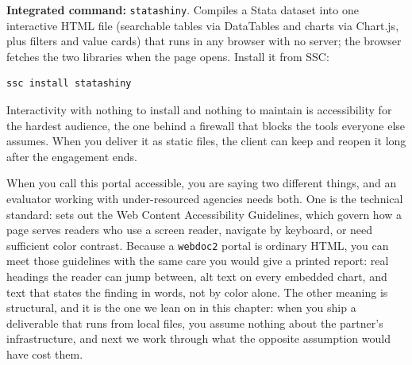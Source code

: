 \begin{kaobox}[frametitle=Package Integration: \texttt{statashiny}]
\textbf{Integrated command:} \texttt{statashiny}. Compiles a Stata dataset into one interactive HTML file (searchable tables via DataTables and charts via Chart.js, plus filters and value cards) that runs in any browser with no server; the browser fetches the two libraries when the page opens. Install it from SSC:
\par
{\footnotesize
\begin{verbatim}
ssc install statashiny
\end{verbatim}
}
\end{kaobox}

Interactivity with nothing to install and nothing to maintain is accessibility for the hardest audience, the one behind a firewall that blocks the tools everyone else assumes. When you deliver it as static files, the client can keep and reopen it long after the engagement ends.

When you call this portal accessible, you are saying two different things, and an evaluator working with under-resourced agencies needs both. One is the technical standard: \textcite{w3c2018wcag} sets out the Web Content Accessibility Guidelines, which govern how a page serves readers who use a screen reader, navigate by keyboard, or need sufficient color contrast. Because a \texttt{webdoc2} portal is ordinary HTML, you can meet those guidelines with the same care you would give a printed report: real headings the reader can jump between, alt text on every embedded chart, and text that states the finding in words, not by color alone. The other meaning is structural, and it is the one we lean on in this chapter: when you ship a deliverable that runs from local files, you assume nothing about the partner's infrastructure, and next we work through what the opposite assumption would have cost them.

